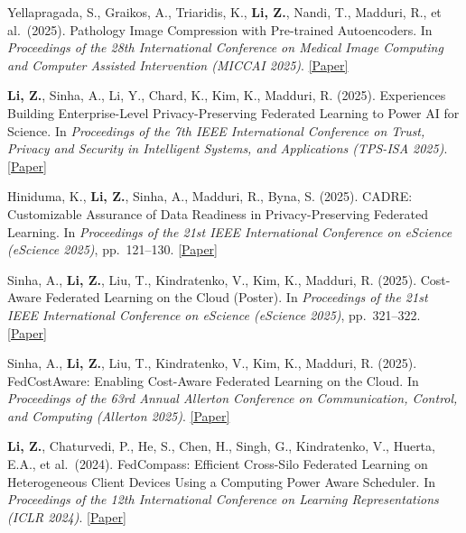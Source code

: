 \documentclass[letterpaper,11pt]{article}
\begin{document}
\begin{enumerate}[leftmargin=1cm, label={[\arabic*]}, itemsep=3pt]
  \item Yellapragada, S., Graikos, A., Triaridis, K., \textbf{Li, Z.}, Nandi, T., Madduri, R., et al.\ (2025). Pathology Image Compression with Pre-trained Autoencoders. In \textit{Proceedings of the 28th International Conference on Medical Image Computing and Computer Assisted Intervention (MICCAI 2025)}. \href{https://arxiv.org/abs/2503.11591}{[Paper]}

  \item \textbf{Li, Z.}, Sinha, A., Li, Y., Chard, K., Kim, K., Madduri, R. (2025). Experiences Building Enterprise-Level Privacy-Preserving Federated Learning to Power AI for Science. In \textit{Proceedings of the 7th IEEE International Conference on Trust, Privacy and Security in Intelligent Systems, and Applications (TPS-ISA 2025)}. \href{https://arxiv.org/abs/2511.08998}{[Paper]}

  \item Hiniduma, K., \textbf{Li, Z.}, Sinha, A., Madduri, R., Byna, S. (2025). CADRE: Customizable Assurance of Data Readiness in Privacy-Preserving Federated Learning. In \textit{Proceedings of the 21st IEEE International Conference on eScience (eScience 2025)}, pp.\ 121--130. \href{https://doi.org/10.1109/eScience65000.2025.00023}{[Paper]}

  \item Sinha, A., \textbf{Li, Z.}, Liu, T., Kindratenko, V., Kim, K., Madduri, R. (2025). Cost-Aware Federated Learning on the Cloud (Poster). In \textit{Proceedings of the 21st IEEE International Conference on eScience (eScience 2025)}, pp.\ 321--322. \href{https://arxiv.org/abs/2505.21727}{[Paper]}

  \item Sinha, A., \textbf{Li, Z.}, Liu, T., Kindratenko, V., Kim, K., Madduri, R. (2025). FedCostAware: Enabling Cost-Aware Federated Learning on the Cloud. In \textit{Proceedings of the 63rd Annual Allerton Conference on Communication, Control, and Computing (Allerton 2025)}. \href{https://arxiv.org/abs/2505.21727}{[Paper]}


  \item \textbf{Li, Z.}, Chaturvedi, P., He, S., Chen, H., Singh, G., Kindratenko, V., Huerta, E.A., et al.\ (2024). FedCompass: Efficient Cross-Silo Federated Learning on Heterogeneous Client Devices Using a Computing Power Aware Scheduler. In \textit{Proceedings of the 12th International Conference on Learning Representations (ICLR 2024)}. \href{https://openreview.net/forum?id=msXxrttLOi}{[Paper]}


\end{enumerate}
\end{document}

